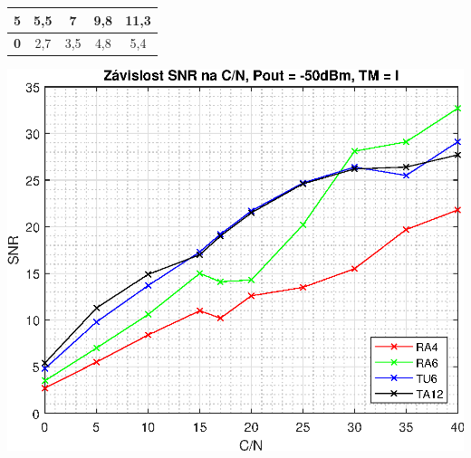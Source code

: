 \documentclass[10pt, a4paper]{article}%
\begin{document}
\begin{table}[ht!]
\begin{minipage}{0.5\textwidth}
{\begin{tabular}{|ccccc|}
        \multicolumn{1}{|c|}{\textbf{5}}  & \multicolumn{1}{c|}{5,5}  & \multicolumn{1}{c|}{7}    & \multicolumn{1}{c|}{9,8}  & 11,3 \\ \hline
        \multicolumn{1}{|c|}{\textbf{0}}  & \multicolumn{1}{c|}{2,7}  & \multicolumn{1}{c|}{3,5}  & \multicolumn{1}{c|}{4,8}  & 5,4  \\ \hline
        \end{tabular}%
    }
\end{minipage}
\hfill
\begin{minipage}{0.45\textwidth}
    \centering
    \includegraphics[width=1\textwidth]{SNR_CN_CHANNELS.eps}
\end{minipage}

\end{table}
\end{document}
